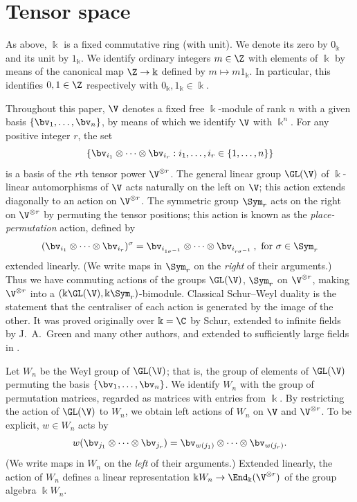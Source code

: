 \section{Tensor space}\label{sec:bimodules}%
As above, $\Bbbk$ is a fixed commutative ring (with unit). We denote
its zero by $0_\Bbbk$ and its unit by $1_\Bbbk$. We identify ordinary
integers $m \in \Z$ with elements of $\Bbbk$ by means of the canonical
map $\Z \to \Bbbk$ defined by $m \mapsto m 1_\Bbbk$. In particular,
this identifies $0,1 \in \Z$ respectively with $0_\Bbbk, 1_\Bbbk \in
\Bbbk$.

Throughout this paper, $\V$ denotes a fixed free $\Bbbk$-module of
rank $n$ with a given basis $\{\bv_1, \dots, \bv_n\}$, by means of which
we identify $\V$ with $\Bbbk^n$. For any positive integer $r$, the set
\begin{equation}\label{eq:TS-basis}
\{ \bv_{i_1} \otimes \cdots \otimes \bv_{i_r} :
 i_1,\dots, i_r \in \{ 1,
\dots, n\} \}
\end{equation}
is a basis of the $r$th tensor power $\V^{\otimes r}$. The general
linear group $\GL(\V)$ of $\Bbbk$-linear automorphisms of $\V$ acts
naturally on the left on $\V$; this action extends diagonally to an
action on $\V^{\otimes r}$. The symmetric group $\Sym_r$ acts on the
right on $\V^{\otimes r}$ by permuting the tensor positions; this
action is known as the \emph{place-permutation} action, defined by
\begin{equation}\label{eq:PP-action}
(\bv_{i_1} \otimes \cdots \otimes \bv_{i_r})^\sigma = \bv_{i_{1 \sigma^{-1}}}
\otimes \cdots \otimes \bv_{i_{r \sigma^{-1}}} \, , \text{ for } \sigma \in
\Sym_r
\end{equation}
extended linearly. (We write maps in $\Sym_r$ on the \emph{right} of
their arguments.) Thus we have commuting actions of the groups
$\GL(\V)$, $\Sym_r$ on $\V^{\otimes r}$, making $\V^{\otimes r}$ into
a $(\Bbbk \GL(\V), \Bbbk \Sym_r)$-bimodule. Classical Schur--Weyl
duality is the statement that the centraliser of each action is
generated by the image of the other. It was proved originally over
$\Bbbk = \C$ by Schur, extended to infinite fields by J.~A.~Green and
many other authors, and extended to sufficiently large fields in
\cite{Benson-Doty}.


Let $W_n$ be the Weyl group of $\GL(\V)$; that is, the group of elements
of $\GL(\V)$ permuting the basis $\{\bv_1, \dots, \bv_n\}$. We identify
$W_n$ with the group of permutation matrices, regarded as matrices
with entries from $\Bbbk$. By restricting the action of $\GL(\V)$ to
$W_n$, we obtain left actions of $W_n$ on $\V$ and $\V^{\otimes
 r}$. To be explicit, $w \in W_n$ acts by
\begin{equation}\label{eq:W_n-action}
 w (\bv_{j_1} \otimes \cdots \otimes \bv_{j_r}) = \bv_{w(j_1)} \otimes
 \cdots \otimes \bv_{w(j_r)}.
\end{equation}
(We write maps in $W_n$ on the \emph{left} of their arguments.)
Extended linearly, the action of $W_n$ defines a linear representation
$\Bbbk W_n \to \End_\Bbbk( \V^{\otimes r} )$ of the group algebra
$\Bbbk W_n$.

